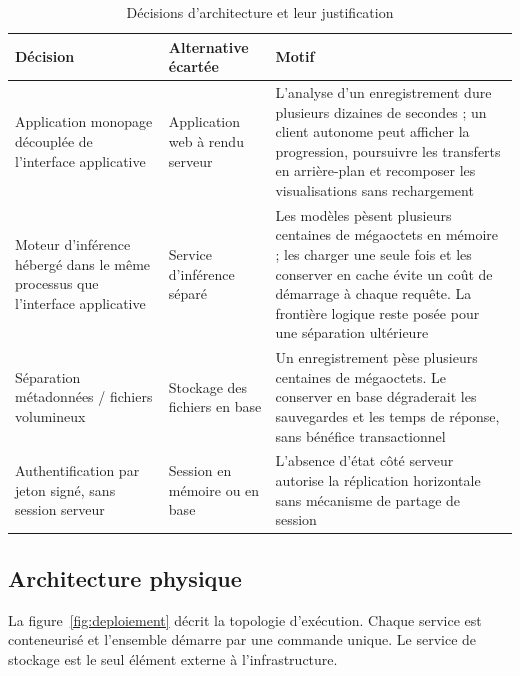\begin{table}[H]
\centering

\small
\begin{tabular}{@{}L{3.2cm}L{5.2cm}L{5.6cm}@{}}
\toprule
\textbf{Décision} & \textbf{Alternative écartée} & \textbf{Motif} \\
\midrule
Application monopage découplée de l'interface applicative &
Application web à rendu serveur &
L'analyse d'un enregistrement dure plusieurs dizaines de secondes ; un client
autonome peut afficher la progression, poursuivre les transferts en arrière-plan et
recomposer les visualisations sans rechargement \\
\addlinespace[3pt]
Moteur d'inférence hébergé dans le même processus que l'interface applicative &
Service d'inférence séparé &
Les modèles pèsent plusieurs centaines de mégaoctets en mémoire ; les charger une
seule fois et les conserver en cache évite un coût de démarrage à chaque requête. La
frontière logique reste posée pour une séparation ultérieure \\
\addlinespace[3pt]
Séparation métadonnées / fichiers volumineux &
Stockage des fichiers en base &
Un enregistrement pèse plusieurs centaines de mégaoctets. Le conserver en base
dégraderait les sauvegardes et les temps de réponse, sans bénéfice transactionnel \\
\addlinespace[3pt]
Authentification par jeton signé, sans session serveur &
Session en mémoire ou en base &
L'absence d'état côté serveur autorise la réplication horizontale sans mécanisme de
partage de session \\
\bottomrule
\end{tabular}
\caption{Décisions d'architecture et leur justification}
\label{tab:choix}
\end{table}

\subsection{Architecture physique}

La figure~\ref{fig:deploiement} décrit la topologie d'exécution. Chaque service est
conteneurisé et l'ensemble démarre par une commande unique. Le service de stockage est
le seul élément externe à l'infrastructure.

